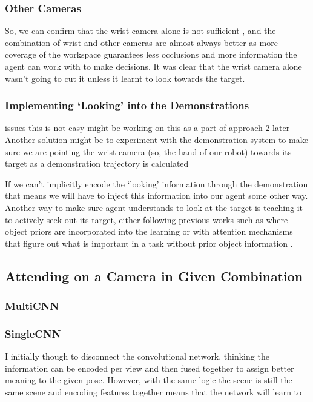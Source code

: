 \subsubsection{Other Cameras}
So, we can confirm that the wrist camera alone is not sufficient , and the combination of wrist and other cameras are almost always better as more coverage of the workspace guarantees less occlusions and more information the agent can work with to make decisions. It was clear that the wrist camera alone wasn't going to cut it unless it learnt to look towards the target.



\subsubsection{Implementing `Looking' into the Demonstrations}\label{ew-looking-at-target}
issues this is not easy might be working on this as a part of approach 2 later
Another solution might be to experiment with the demonstration system to make sure we are pointing the wrist camera (so, the hand of our robot) towards its target as a demonstration trajectory is calculated 

If we can't implicitly encode the `looking' information through the demonstration that means we will have to inject this information into our agent some other way. Another way to make sure agent understands to look at the target is teaching it to actively seek out its target, either following previous works such as  where object priors are incorporated into the learning or with attention mechanisms that figure out what is important in a task without prior object information .  

\subsection{Attending on a Camera in Given Combination}
\subsubsection{MultiCNN}
\subsubsection{SingleCNN}
I initially though to disconnect the convolutional network, thinking the information can be encoded per view and then fused together to assign better meaning to the given pose. However, with the same logic the scene is still the same scene and encoding features together means that the network will learn to 